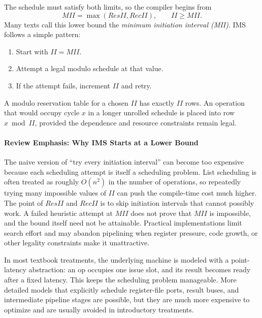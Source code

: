 The schedule must satisfy both limits, so the compiler begins from
\begin{equation}\label{eq:ilp-min-ii}
    MII=\max(ResII,RecII),\qquad II\ge MII.
\end{equation}
Many texts call this lower bound the \textit{minimum initiation interval (MII)}.
IMS follows a simple pattern:
\begin{enumerate}
    \item Start with $II=MII$.
    \item Attempt a legal modulo schedule at that value.
    \item If the attempt fails, increment $II$ and retry.
\end{enumerate}
A modulo reservation table for a chosen $II$ has exactly $II$ rows.
An operation that would occupy cycle $x$ in a longer unrolled schedule is placed into row $x \bmod II$, provided the dependence and resource constraints remain legal.

\paragraph{Review Emphasis: Why IMS Starts at a Lower Bound}\label{par:ch7-review-ims-lower-bound}
The naive version of ``try every initiation interval'' can become too expensive because each scheduling attempt is itself a scheduling problem.
List scheduling is often treated as roughly $O(n^2)$ in the number of operations, so repeatedly trying many impossible values of $II$ can push the compile-time cost much higher.
The point of $ResII$ and $RecII$ is to skip initiation intervals that cannot possibly work.
A failed heuristic attempt at $MII$ does not prove that $MII$ is impossible, and the bound itself need not be attainable.
Practical implementations limit search effort and may abandon pipelining when register pressure, code growth, or other legality constraints make it unattractive.

In most textbook treatments, the underlying machine is modeled with a point-latency abstraction: an op occupies one issue slot, and its result becomes ready after a fixed latency.
This keeps the scheduling problem manageable.
More detailed models that explicitly schedule register-file ports, result buses, and intermediate pipeline stages are possible, but they are much more expensive to optimize and are usually avoided in introductory treatments.


